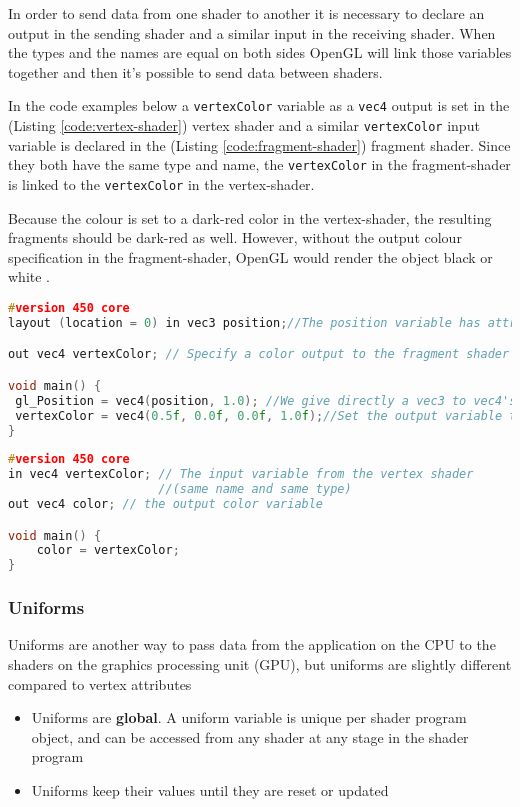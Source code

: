 In order to send data from one \gls{shader} to another it is necessary to declare an output in the sending shader and a similar input in the receiving shader. When the types and the names are equal on both sides OpenGL will link those variables together and then it's possible to send data between shaders.

In the code examples below a \verb|vertexColor| variable as a \verb|vec4| output is set in the (Listing \ref{code:vertex-shader}) vertex shader and a similar \verb|vertexColor| input variable is declared in the (Listing \ref{code:fragment-shader}) fragment shader. Since they both have the same type and name, the \verb|vertexColor| in the \gls{fragment-shader} is linked to the \verb|vertexColor| in the \gls{vertex-shader}. 

Because the colour is set to a dark-red color in the \gls{vertex-shader}, the resulting fragments should be dark-red as well. However, without the output colour specification in the \gls{fragment-shader}, OpenGL would render the object black or white \cite{learnopengl}.


\begin{lstlisting}[language=C++, caption={Vertex Shader}, label={code:vertex-shader}]
#version 450 core
layout (location = 0) in vec3 position;//The position variable has attribute position 0

out vec4 vertexColor; // Specify a color output to the fragment shader

void main() {
 gl_Position = vec4(position, 1.0); //We give directly a vec3 to vec4's constructor
 vertexColor = vec4(0.5f, 0.0f, 0.0f, 1.0f);//Set the output variable to a dark-red color
}

\end{lstlisting}

\begin{lstlisting}[language=C++, caption={Fragment Shader}, label={code:fragment-shader}]
#version 450 core
in vec4 vertexColor; // The input variable from the vertex shader 
					 //(same name and same type)
out vec4 color; // the output color variable

void main() {
	color = vertexColor;
} 
\end{lstlisting}

\subsubsection{Uniforms}

Uniforms are another way to pass data from the application on the CPU to the \glspl{shader} on the graphics processing unit (GPU), but uniforms are slightly different compared to vertex attributes \cite{learnopengl}
\begin{itemize}
	\item Uniforms are \textbf{global}. A uniform variable is unique per shader program object, and can be accessed from any shader at any stage in the shader program
	\item Uniforms keep their values until they are reset or updated
\end{itemize}

